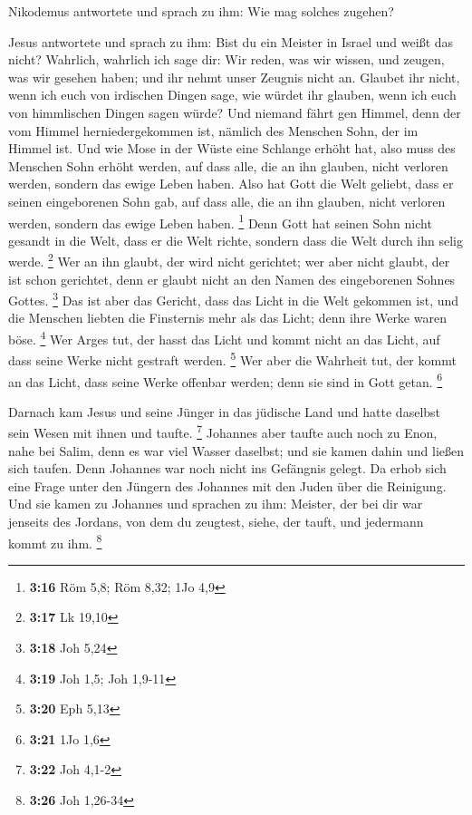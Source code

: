  Nikodemus antwortete und sprach zu ihm: Wie mag solches
zugehen?

 Jesus antwortete und sprach zu ihm: Bist du ein Meister
in Israel und weißt das nicht?  Wahrlich, wahrlich ich
sage dir: Wir reden, was wir wissen, und zeugen, was wir gesehen haben;
und ihr nehmt unser Zeugnis nicht an.  Glaubet ihr nicht,
wenn ich euch von irdischen Dingen sage, wie würdet ihr glauben, wenn
ich euch von himmlischen Dingen sagen würde?  Und niemand
fährt gen Himmel, denn der vom Himmel herniedergekommen ist, nämlich des
Menschen Sohn, der im Himmel ist.  Und wie Mose in der
Wüste eine Schlange erhöht hat, also muss des Menschen Sohn erhöht
werden,  auf dass alle, die an ihn glauben, nicht
verloren werden, sondern das ewige Leben haben.  Also hat
Gott die Welt geliebt, dass er seinen eingeborenen Sohn gab, auf dass
alle, die an ihn glauben, nicht verloren werden, sondern das ewige Leben
haben. \footnote{\textbf{3:16} Röm 5,8; Röm 8,32; 1Jo 4,9}
 Denn Gott hat seinen Sohn nicht gesandt in die Welt,
dass er die Welt richte, sondern dass die Welt durch ihn selig werde.
\footnote{\textbf{3:17} Lk 19,10}  Wer an ihn glaubt, der
wird nicht gerichtet; wer aber nicht glaubt, der ist schon gerichtet,
denn er glaubt nicht an den Namen des eingeborenen Sohnes Gottes.
\footnote{\textbf{3:18} Joh 5,24}  Das ist aber das
Gericht, dass das Licht in die Welt gekommen ist, und die Menschen
liebten die Finsternis mehr als das Licht; denn ihre Werke waren böse.
\footnote{\textbf{3:19} Joh 1,5; Joh 1,9-11}  Wer Arges
tut, der hasst das Licht und kommt nicht an das Licht, auf dass seine
Werke nicht gestraft werden. \footnote{\textbf{3:20} Eph 5,13}
 Wer aber die Wahrheit tut, der kommt an das Licht, dass
seine Werke offenbar werden; denn sie sind in Gott getan. \footnote{\textbf{3:21}
  1Jo 1,6}

 Darnach kam Jesus und seine Jünger in das jüdische Land
und hatte daselbst sein Wesen mit ihnen und taufte. \footnote{\textbf{3:22}
  Joh 4,1-2}  Johannes aber taufte auch noch zu Enon,
nahe bei Salim, denn es war viel Wasser daselbst; und sie kamen dahin
und ließen sich taufen.  Denn Johannes war noch nicht ins
Gefängnis gelegt.  Da erhob sich eine Frage unter den
Jüngern des Johannes mit den Juden über die Reinigung. 
Und sie kamen zu Johannes und sprachen zu ihm: Meister, der bei dir war
jenseits des Jordans, von dem du zeugtest, siehe, der tauft, und
jedermann kommt zu ihm. \footnote{\textbf{3:26} Joh 1,26-34}

